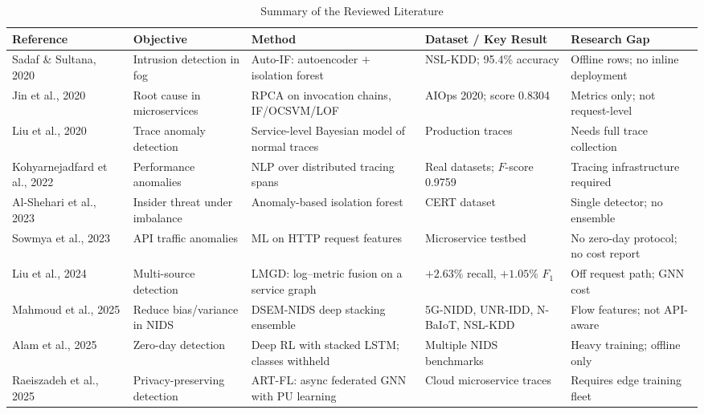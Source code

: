 \documentclass[conference]{IEEEtran}
\begin{document}
\begin{table}[!b]
\caption{Summary of the Reviewed Literature}
\label{tab:lit}
\centering
\scriptsize
\renewcommand{\arraystretch}{1.2}
\setlength{\tabcolsep}{4pt}
\begin{tabularx}{\textwidth}{@{}P{2.15cm}P{2.6cm}LP{2.9cm}P{2.75cm}@{}}
\toprule
\textbf{Reference} & \textbf{Objective} & \textbf{Method} & \textbf{Dataset / Key Result} &
\textbf{Research Gap} \\
\midrule
Sadaf \& Sultana, 2020 \cite{sadaf2020autoif} & Intrusion detection in fog &
Auto-IF: autoencoder $+$ isolation forest & NSL-KDD; 95.4\% accuracy &
Offline rows; no inline deployment \\
Jin et al., 2020 \cite{jin2020rpca} & Root cause in microservices &
RPCA on invocation chains, IF/OCSVM/LOF & AIOps 2020; score 0.8304 &
Metrics only; not request-level \\
Liu et al., 2020 \cite{liu2020traceanomaly} & Trace anomaly detection &
Service-level Bayesian model of normal traces & Production traces &
Needs full trace collection \\
Kohyarnejadfard et al., 2022 \cite{kohyarnejadfard2022nlp} & Performance anomalies &
NLP over distributed tracing spans & Real datasets; $F$-score 0.9759 &
Tracing infrastructure required \\
Al-Shehari et al., 2023 \cite{alshehari2023insider} & Insider threat under imbalance &
Anomaly-based isolation forest & CERT dataset &
Single detector; no ensemble \\
Sowmya et al., 2023 \cite{sowmya2023api} & API traffic anomalies &
ML on HTTP request features & Microservice testbed &
No zero-day protocol; no cost report \\
Liu et al., 2024 \cite{liu2024lmgd} & Multi-source detection &
LMGD: log--metric fusion on a service graph & $+2.63\%$ recall, $+1.05\%$ $F_1$ &
Off request path; GNN cost \\
Mahmoud et al., 2025 \cite{mahmoud2025dsem} & Reduce bias/variance in NIDS &
DSEM-NIDS deep stacking ensemble & 5G-NIDD, UNR-IDD, N-BaIoT, NSL-KDD &
Flow features; not API-aware \\
Alam et al., 2025 \cite{alam2025adaptive} & Zero-day detection &
Deep RL with stacked LSTM; classes withheld & Multiple NIDS benchmarks &
Heavy training; offline only \\
Raeiszadeh et al., 2025 \cite{raeiszadeh2025artfl} & Privacy-preserving detection &
ART-FL: async federated GNN with PU learning & Cloud microservice traces &
Requires edge training fleet \\

\end{tabularx}
\end{table}
\end{document}
